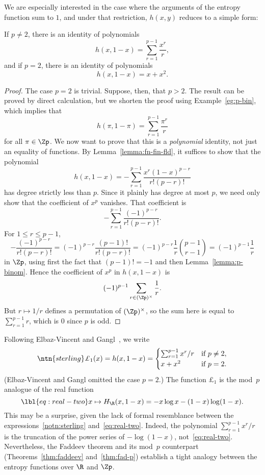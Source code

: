 We are especially interested in the case where the arguments of the entropy
function sum to $1$, and under that restriction, $h(x, y)$ reduces to a
simple form:

\begin{lemma}
If $p \neq 2$, there is an identity of polynomials
\[
h(x, 1 - x) = \sum_{r = 1}^{p - 1} \frac{x^r}{r},
\]
and if $p = 2$, there is an identity of polynomials 
\[
h(x, 1 - x) = x + x^2.
\]
\end{lemma}

\begin{proof}
The case $p = 2$ is trivial.  Suppose, then, that $p > 2$.  
% 
The result can be proved by direct calculation, but we shorten the proof 
using Example~\ref{eg:p-bin}, which implies that
\[
h(\pi, 1 - \pi) = \sum_{r = 1}^{p - 1} \frac{\pi^r}{r}
\]
for all $\pi \in \Zp$.  We now want to prove that this is a
\emph{polynomial} identity, not just an equality of functions.  By
Lemma~\ref{lemma:fn-fin-fld}, it suffices to show that the polynomial
\[
h(x, 1 - x) 
= 
-\sum_{r = 1}^{p - 1} \frac{x^r(1 - x)^{p - r}}{r!(p - r)!}
\]
has degree strictly less than $p$.  Since it plainly has degree at most
$p$, we need only show that the coefficient of $x^p$ vanishes.  That
coefficient is 
\[
-\sum_{r = 1}^{p - 1} \frac{(-1)^{p - r}}{r! (p - r)!}.
\]
For $1 \leq r \leq p - 1$,
\[
- \frac{(-1)^{p - r}}{r! (p - r)!}
=
(-1)^{p - r} \frac{(p - 1)!}{r! (p - r)!}
=
(-1)^{p - r} \frac{1}{r} \binom{p - 1}{r - 1}
=
(-1)^{p - 1} \frac{1}{r}
\]
in $\Zp$, using first the fact that $(p - 1)! = -1$ and then
Lemma~\ref{lemma:p-binom}.  Hence the coefficient of $x^p$ in $h(x, 1 - x)$
is
\[
(-1)^{p - 1} \sum_{r \in (\Zp)^\times} \frac{1}{r}.
\]
But $r \mapsto 1/r$ defines a permutation of $(\Zp)^\times$, so the sum
here is equal to $\sum_{r = 1}^{p - 1} r$, which is $0$ since $p$ is odd.
\end{proof}

Following Elbaz-Vincent%
%
% 
and Gangl~\cite{EVGOPI},%
%
% 
we write
% 
\begin{equation}
\ntn{sterling}
\pounds_1(x) 
= 
h(x, 1 - x)
=
\begin{cases}
\sum_{r = 1}^{p - 1} x^r/r      &\text{if } p \neq 2,   \\
x + x^2                         &\text{if } p = 2.
\end{cases}
\end{equation}
% 
(Elbaz-Vincent and Gangl omitted the case $p = 2$.)  The
function $\pounds_1$ is the mod~$p$ analogue of the real function
% 
\begin{equation}
\lbl{eq:real-two}
x 
\mapsto 
H_\R(x, 1 - x)
=
- x \log x - (1 - x) \log(1 - x).
\end{equation}
% 
This may be a surprise, given the lack of formal resemblance between the
expressions~\eqref{notn:sterling} and~\eqref{eq:real-two}.  Indeed, the
polynomial $\sum_{r = 1}^{p - 1} x^r/r$ is the truncation of the power
series of $-\log(1 - x)$, not~\eqref{eq:real-two}.  Nevertheless, the
Faddeev theorem and its mod~$p$ counterpart (Theorems~\ref{thm:faddeev}
and~\ref{thm:fad-p}) establish a tight analogy between the entropy
functions over $\R$ and $\Zp$.

